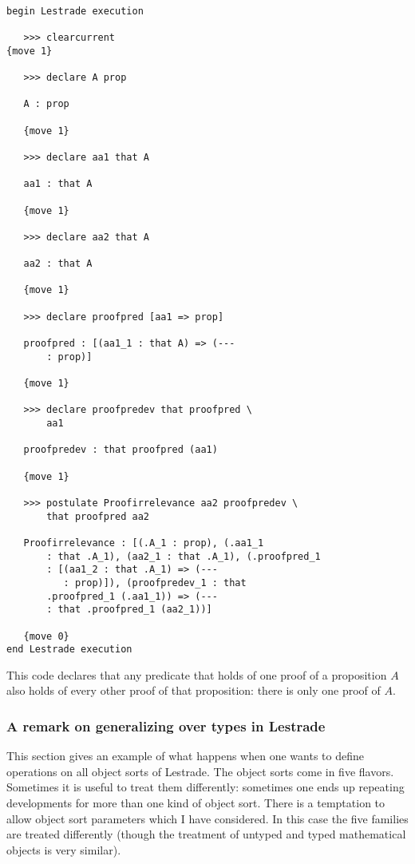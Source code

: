 \documentclass[12pt]{article}
\begin{document}
\begin{verbatim}

begin Lestrade execution

   >>> clearcurrent
{move 1}

   >>> declare A prop

   A : prop

   {move 1}

   >>> declare aa1 that A

   aa1 : that A

   {move 1}

   >>> declare aa2 that A

   aa2 : that A

   {move 1}

   >>> declare proofpred [aa1 => prop]

   proofpred : [(aa1_1 : that A) => (--- 
       : prop)]

   {move 1}

   >>> declare proofpredev that proofpred \
       aa1

   proofpredev : that proofpred (aa1)

   {move 1}

   >>> postulate Proofirrelevance aa2 proofpredev \
       that proofpred aa2

   Proofirrelevance : [(.A_1 : prop), (.aa1_1 
       : that .A_1), (aa2_1 : that .A_1), (.proofpred_1 
       : [(aa1_2 : that .A_1) => (--- 
          : prop)]), (proofpredev_1 : that 
       .proofpred_1 (.aa1_1)) => (--- 
       : that .proofpred_1 (aa2_1))]

   {move 0}
end Lestrade execution

\end{verbatim}

This code declares that any predicate that holds of one proof of a proposition $A$ also holds of every other proof of that proposition:  there is only one proof of $A$.

\subsubsection{A remark on generalizing over types in Lestrade}

This section gives an example of what happens when one wants to define operations on all object sorts of Lestrade.  The object sorts come in five flavors.  Sometimes it is useful to treat them differently:  sometimes one ends up repeating developments for more than
one kind of object sort.  There is a temptation to allow object sort parameters which I have considered.  In this case the five families are treated differently (though the treatment of untyped and typed mathematical objects is very similar).
\end{document}

